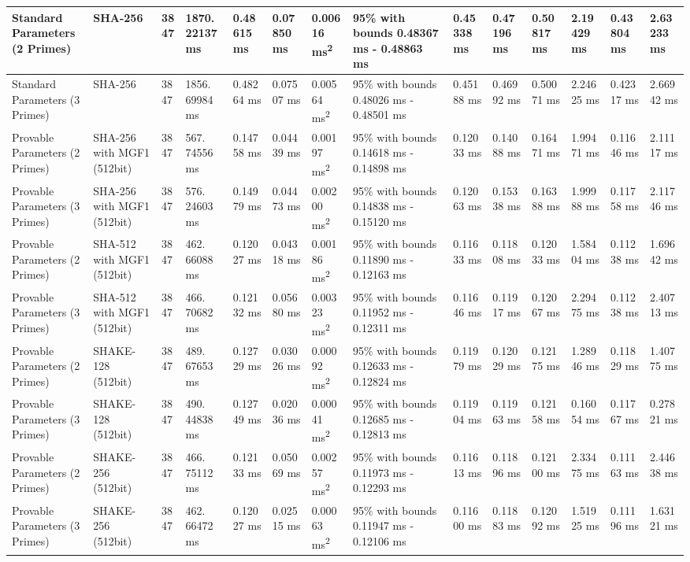 \documentclass[]{final_report}
\theoremstyle{definition}
\begin{document}
\begin{landscape}
\begin{longtable}{|p{2.3cm}|p{1.8cm}|p{1.0cm}|p{1.7cm}|p{1.4cm}|p{1.5cm}|p{1.8cm}|p{1.5cm}|p{1.43cm}|p{1.5cm}|p{1.3cm}|p{1.4cm}|p{1.3cm}|p{1.3cm}|}
\hline
\endlastfoot
Standard Parameters (2 Primes) & SHA-256 & 3847 & 1870.
22137 ms & 0.48615 ms & 0.07850 ms & 0.00616 ms\textsuperscript{2} & 95\% with bounds 0.48367 ms - 0.48863 ms & 0.45338 ms & 0.47196 ms & 0.50817 ms & 2.19429 ms & 0.43804 ms & 2.63233 ms \\
\hline
Standard Parameters (3 Primes) & SHA-256 & 3847 & 1856.
69984 ms & 0.48264 ms & 0.07507 ms & 0.00564 ms\textsuperscript{2} & 95\% with bounds 0.48026 ms - 0.48501 ms & 0.45188 ms & 0.46992 ms & 0.50071 ms & 2.24625 ms & 0.42317 ms & 2.66942 ms \\
\hline
Provable Parameters (2 Primes) & SHA-256 with MGF1 (512bit) & 3847 & 567.
74556 ms & 0.14758 ms & 0.04439 ms & 0.00197 ms\textsuperscript{2} & 95\% with bounds 0.14618 ms - 0.14898 ms & 0.12033 ms & 0.14088 ms & 0.16471 ms & 1.99471 ms & 0.11646 ms & 2.11117 ms \\
\hline
Provable Parameters (3 Primes) & SHA-256 with MGF1 (512bit) & 3847 & 576.
24603 ms & 0.14979 ms & 0.04473 ms & 0.00200 ms\textsuperscript{2} & 95\% with bounds 0.14838 ms - 0.15120 ms & 0.12063 ms & 0.15338 ms & 0.16388 ms & 1.99988 ms & 0.11758 ms & 2.11746 ms \\
\hline
Provable Parameters (2 Primes) & SHA-512 with MGF1 (512bit) & 3847 & 462.
66088 ms & 0.12027 ms & 0.04318 ms & 0.00186 ms\textsuperscript{2} & 95\% with bounds 0.11890 ms - 0.12163 ms & 0.11633 ms & 0.11808 ms & 0.12033 ms & 1.58404 ms & 0.11238 ms & 1.69642 ms \\
\hline
Provable Parameters (3 Primes) & SHA-512 with MGF1 (512bit) & 3847 & 466.
70682 ms & 0.12132 ms & 0.05680 ms & 0.00323 ms\textsuperscript{2} & 95\% with bounds 0.11952 ms - 0.12311 ms & 0.11646 ms & 0.11917 ms & 0.12067 ms & 2.29475 ms & 0.11238 ms & 2.40713 ms \\
\hline
Provable Parameters (2 Primes) & SHAKE-128 (512bit) & 3847 & 489.
67653 ms & 0.12729 ms & 0.03026 ms & 0.00092 ms\textsuperscript{2} & 95\% with bounds 0.12633 ms - 0.12824 ms & 0.11979 ms & 0.12029 ms & 0.12175 ms & 1.28946 ms & 0.11829 ms & 1.40775 ms \\
\hline
Provable Parameters (3 Primes) & SHAKE-128 (512bit) & 3847 & 490.
44838 ms & 0.12749 ms & 0.02036 ms & 0.00041 ms\textsuperscript{2} & 95\% with bounds 0.12685 ms - 0.12813 ms & 0.11904 ms & 0.11963 ms & 0.12158 ms & 0.16054 ms & 0.11767 ms & 0.27821 ms \\
\hline
Provable Parameters (2 Primes) & SHAKE-256 (512bit) & 3847 & 466.
75112 ms & 0.12133 ms & 0.05069 ms & 0.00257 ms\textsuperscript{2} & 95\% with bounds 0.11973 ms - 0.12293 ms & 0.11613 ms & 0.11896 ms & 0.12100 ms & 2.33475 ms & 0.11163 ms & 2.44638 ms \\
\hline
Provable Parameters (3 Primes) & SHAKE-256 (512bit) & 3847 & 462.
66472 ms & 0.12027 ms & 0.02515 ms & 0.00063 ms\textsuperscript{2} & 95\% with bounds 0.11947 ms - 0.12106 ms & 0.11600 ms & 0.11883 ms & 0.12092 ms & 1.51925 ms & 0.11196 ms & 1.63121 ms \\
\hline
\end{longtable}


\end{landscape}
\end{document}
